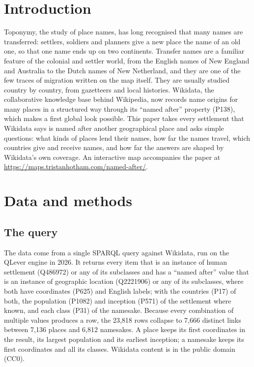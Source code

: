 \documentclass[11pt,a4paper]{article}
\begin{document}
\section{Introduction}
Toponymy, the study of place names, has long recognised that many names are transferred: settlers, soldiers and planners give a new place the name of an old one, so that one name ends up on two continents. Transfer names are a familiar feature of the colonial and settler world, from the English names of New England and Australia to the Dutch names of New Netherland, and they are one of the few traces of migration written on the map itself. They are usually studied country by country, from gazetteers and local histories. Wikidata, the collaborative knowledge base behind Wikipedia, now records name origins for many places in a structured way through its ``named after'' property (P138), which makes a first global look possible. This paper takes every settlement that Wikidata says is named after another geographical place and asks simple questions: what kinds of places lend their names, how far the names travel, which countries give and receive names, and how far the answers are shaped by Wikidata's own coverage. An interactive map accompanies the paper at \url{https://maps.tristanhotham.com/named-after/}.

\section{Data and methods}
\subsection{The query}
The data come from a single SPARQL query against Wikidata, run on the QLever engine \citep{qlever} in 2026. It returns every item that is an instance of human settlement (Q486972) or any of its subclasses and has a ``named after'' value that is an instance of geographic location (Q2221906) or any of its subclasses, where both have coordinates (P625) and English labels; with the countries (P17) of both, the population (P1082) and inception (P571) of the settlement where known, and each class (P31) of the namesake. Because every combination of multiple values produces a row, the 23,818 rows collapse to 7,666 distinct links between 7,136 places and 6,812 namesakes. A place keeps its first coordinates in the result, its largest population and its earliest inception; a namesake keeps its first coordinates and all its classes. Wikidata content is in the public domain (CC0).
\end{document}
